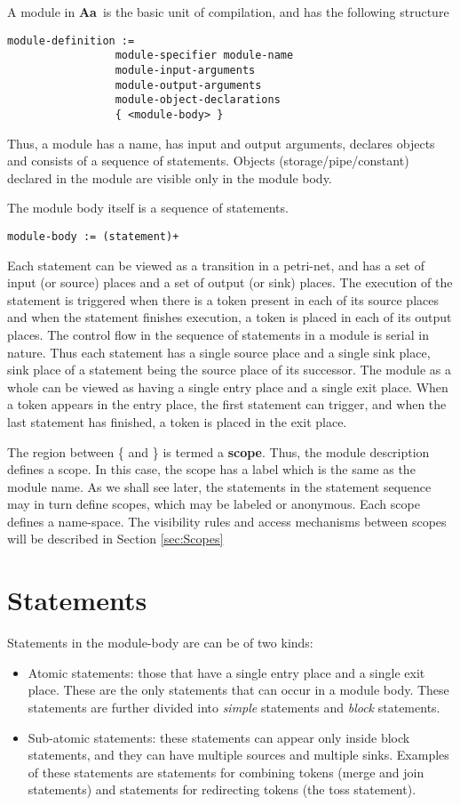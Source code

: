 \documentclass{article}
\newcommand{\Aa}{{\bf Aa}~}
\begin{document}
A module in \Aa is the basic unit of compilation, and
has the following structure
\begin{verbatim}
module-definition :=  
                 module-specifier module-name  
                 module-input-arguments
                 module-output-arguments
                 module-object-declarations
                 { <module-body> }
\end{verbatim}
Thus, a module has a name, has input and output arguments,
declares objects and consists of a sequence of statements.
Objects (storage/pipe/constant) declared in the module are visible only in the
module body. 

The module body itself is a sequence of statements.
\begin{verbatim}
module-body := (statement)+
\end{verbatim}
Each statement can be viewed as a transition
in a petri-net, and has a 
set of input (or source) places  and a set of output
(or sink)  places.  
The execution of the statement is triggered when
there is a token present in each of its source 
places and when the statement finishes execution,
a token is placed in each of its output places.
The control flow in the sequence of statements
in a module is serial in nature.  Thus each
statement has a single source place and a single
sink place, sink place of a statement being 
the source place of its successor.
The module as a whole can be viewed as having
a single entry place and a single exit place.
When a token appears in the entry place, the first
statement can trigger, and when the last statement
has finished, a token is placed in the exit
place.  

The region between \{ and \} is termed a {\bf scope}.  Thus, 
the module description defines a scope.  In this case, 
the scope has a label which is the same as the module name.
As we shall see later, the statements in the statement sequence
may in turn define scopes, which may be labeled or anonymous.
Each scope defines a name-space.  The visibility
rules and access mechanisms between scopes will be described
in Section \ref{sec:Scopes}


\section{Statements}
 
Statements in the module-body are can be of two kinds:
\begin{itemize}
\item Atomic statements: those that have a single
entry place and a single exit place.  These are
the only statements that can occur in a module body.
These statements are further divided into 
{\em simple} statements and {\em block} statements.
\item Sub-atomic statements:  these statements
can appear only inside block statements,  and they
can have multiple sources and multiple sinks.
Examples of these statements are statements for
combining tokens (merge and join statements) and
statements for redirecting tokens (the toss statement).
\end{itemize}
\end{document}
